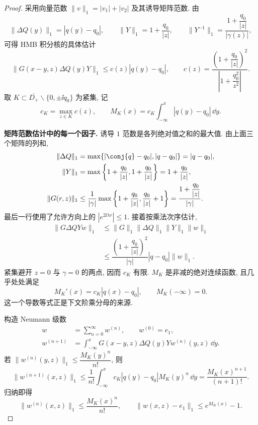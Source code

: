\begin{proof}
采用向量范数 $\|v\|_1=|v_1|+|v_2|$ 及其诱导矩阵范数. 由
\[
\|\Delta Q(y)\|_1=|q(y)-q_0|,\qquad
\|Y\|_1=1+\dfrac{q_0}{|z|},\qquad
\|Y^{-1}\|_1=\dfrac{1+\dfrac{q_0}{|z|}}{|\gamma(z)|},
\]
可得 HMB 积分核的具体估计
\begin{equation}\label{eq:jost-kernel-estimate}
\|G(x-y,z)\Delta Q(y)Y\|_1
\le c(z)|q(y)-q_0|,\qquad
c(z)=\dfrac{\left(1+\dfrac{q_0}{|z|}\right)^2}{\left|1+\dfrac{q_0^2}{z^2}\right|}.
\end{equation}
取 $K\subset\overline{D_+}\mathbin{\backslash}\{0,\pm\ii q_0\}$ 为紧集, 记
\[
c_{K}=\max\limits_{z\in K}c(z),\qquad
M_{K}(x)=c_{K}\int_{-\infty}^{x}|q(y)-q_0|\,\dd y.
\]

\par\medskip\noindent\textbf{矩阵范数估计中的每一个因子.}\quad 
诱导 $1$ 范数是各列绝对值之和的最大值. 由上面三个矩阵的列和,
\begin{align*}
\|\Delta Q\|_1
&=\max\{|\conj{q}-q_0|,|q-q_0|\}=|q-q_0|,\\
\|Y\|_1
&=\max\left\{1+\dfrac{q_0}{|z|},1+\dfrac{q_0}{|z|}\right\}
=1+\dfrac{q_0}{|z|},\\
\|G(r,z)\|_1
&\le\dfrac{1}{|\gamma|}
\max\left\{1+\dfrac{q_0}{|z|},\dfrac{q_0}{|z|}+1\right\}
=\dfrac{1+\dfrac{q_0}{|z|}}{|\gamma|}.
\end{align*}
最后一行使用了允许方向上的 $|e^{2\ii\lambda r}|\le1$.
接着按乘法次序估计,
\begin{align*}
\|G\Delta QYw\|_1
&\le\|G\|_1\|\Delta Q\|_1\|Y\|_1\|w\|_1\\
&\le\dfrac{\left(1+\dfrac{q_0}{|z|}\right)^2}{|\gamma|}
|q-q_0|\|w\|_1.
\end{align*}
紧集避开 $z=0$ 与 $\gamma=0$ 的两点, 因而 $c_{ K}$ 有限.
$M_{ K}$ 是非减的绝对连续函数, 且几乎处处满足
\[
M_{ K}'(x)=c_{ K}|q(x)-q_0|,
\qquad M_{ K}(-\infty)=0.
\]
这一个导数等式正是下文阶乘分母的来源.

构造 Neumann 级数
\begin{equation}\label{eq:jost-neumann}
\begin{aligned}
w&=\sum\limits_{n=0}^{\infty}w^{(n)},\qquad w^{(0)}=e_1,\\
w^{(n+1)}&=\int_{-\infty}^{x}G(x-y,z)\Delta Q(y)Yw^{(n)}(y,z)\,\dd y.
\end{aligned}
\end{equation}
若 $\|w^{(n)}(y,z)\|_1\le \dfrac{M_{K}(y)^n}{n!}$, 则
\[
\|w^{(n+1)}(x,z)\|_1\le\dfrac{1}{n!}\int_{-\infty}^{x}c_{K}|q(y)-q_0|M_{K}(y)^n\,\dd y
=\dfrac{M_{K}(x)^{n+1}}{(n+1)!}.
\]
归纳即得
\begin{equation}\label{eq:jost-factorial}
\|w^{(n)}(x,z)\|_1\le\dfrac{M_{K}(x)^n}{n!},\qquad
\|w(x,z)-e_1\|_1\le e^{M_{K}(x)}-1.
\end{equation}


\end{proof}
